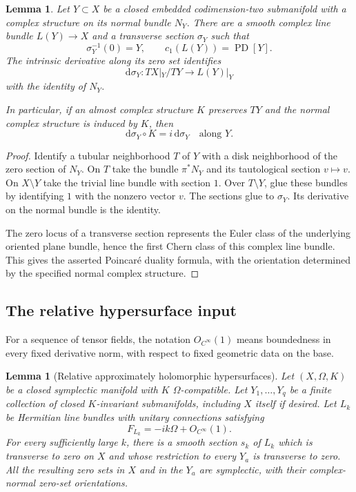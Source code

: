 \documentclass[11pt]{article}
\newtheorem{lemma}[theorem]{Lemma}
\theoremstyle{definition}
\theoremstyle{remark}
\newcommand{\dd}{\mathrm d}
\newcommand{\PD}{\operatorname{PD}}
\begin{document}
\begin{lemma}\label{lem:divisor-bundle}
Let $Y\subset X$ be a closed embedded codimension-two submanifold
with a complex structure on its normal bundle $N_Y$.  There are a
smooth complex line bundle $L(Y)\to X$ and a transverse section
$\sigma_Y$ such that
\[
\sigma_Y^{-1}(0)=Y,\qquad c_1(L(Y))=\PD[Y].
\]
The intrinsic derivative along its zero set identifies
\[
\dd\sigma_Y:TX|_Y/TY\longrightarrow L(Y)|_Y
\]
with the identity of $N_Y$.

In particular, if an almost complex structure $K$ preserves $TY$
and the normal complex structure is induced by $K$, then
\[
\dd\sigma_Y\circ K=i\,\dd\sigma_Y
\quad\text{along }Y.
\]
\end{lemma}

\begin{proof}
Identify a tubular neighborhood $T$ of $Y$ with a disk neighborhood
of the zero section of $N_Y$.  On $T$ take the bundle $\pi^*N_Y$
and its tautological section $v\mapsto v$.  On $X\setminus Y$
take the trivial line bundle with section $1$.  Over
$T\setminus Y$, glue these bundles by identifying $1$ with the
nonzero vector $v$.  The sections glue to $\sigma_Y$.
Its derivative on the normal bundle is the identity.

The zero locus of a transverse section represents the Euler class
of the underlying oriented plane bundle, hence the first Chern
class of this complex line bundle.  This gives the asserted
Poincar\'e duality formula, with the orientation determined by
the specified normal complex structure.
\end{proof}

\subsection{The relative hypersurface input}


For a sequence of tensor fields, the notation $O_{C^\infty}(1)$
means boundedness in every fixed derivative norm, with respect to
fixed geometric data on the base.

\begin{lemma}[Relative approximately holomorphic hypersurfaces]
\label{lem:relative-AH}
Let $(X,\Omega,K)$ be a closed symplectic manifold with $K$
$\Omega$-compatible.  Let $Y_1,\ldots,Y_q$ be a finite collection
of closed $K$-invariant submanifolds, including $X$ itself if
desired.  Let $L_k$ be Hermitian line bundles with unitary
connections satisfying
\[
F_{L_k}=-ik\Omega+O_{C^\infty}(1).
\]
For every sufficiently large $k$, there is a smooth section $s_k$
of $L_k$ which is transverse to zero on $X$ and whose restriction
to every $Y_a$ is transverse to zero.  All the resulting zero
sets in $X$ and in the $Y_a$ are symplectic, with their
complex-normal zero-set orientations.
\end{lemma}
\end{document}
